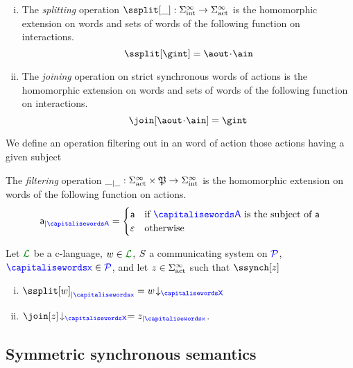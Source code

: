 \begin{definition}\label{def:decomp}
\begin{enumerate}[i)]
\item
  The \emph{splitting} operation
  $\ssplit[\_]: \alfint^\infty \to \alfact^\infty$ 
  is the homomorphic extension on words and sets of words of the following function on interactions. 
  \[
	 \ssplit[\gint] = \aout\cat\ain
  \]
  \item
  The \emph{joining} operation on strict synchronous words of actions 
  is the homomorphic extension on words and sets of words of the following function on interactions. 
  \[
	 \join[\aout\cat\ain] = \gint
  \]
  \end{enumerate}
\end{definition}

We define an operation filtering out in an word of action those actions  having a given subject

\begin{definition}[Filtering]\label{def:decomp}
  The \emph{filtering} operation
  $\__{\mid \_}: \Sigma_{\text{act}}^\infty \times \mathfrak{P} \to
  \Sigma_{\text{int}}^\infty$ is the homomorphic extension on words of the following function on actions. 
  \[
	 \filter{\aact}{\p} =
	 \begin{cases}
		\aact &  \text{if } \p \text{ is the subject of } \aact
		\\
		\emptyword &  \text{otherwise}
	 \end{cases}
  \]
\end{definition}

\begin{fact}
\label{fac:joinsplit}
Let $\clang$ be a c-language, $\acword\in\clang$, $S$ a communicating system on $\mathcal{\color{blue}{P}}$, $\px\in\ptpset$, and let $z\in\Sigma_{\text{act}}^\infty$ such that $\ssynch[z]$
\begin{enumerate}[i)]
\item
$\filter{{\ssplit[{\acword}]}}{\px} = \proj{\acword}{X}$
\item
\label{fac:joinsplit-feqp}
$\proj{\join[z]}{X} = \filter{z}{\px}$. 

\end{enumerate}
\end{fact}



\subsection{Symmetric synchronous semantics}

